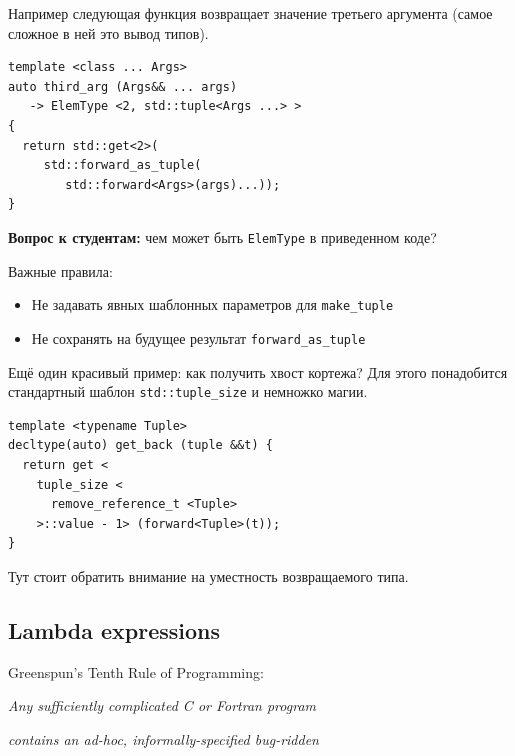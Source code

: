 \documentclass[a4paper,12pt,oneside]{article}
\newif\ifanswers
\begin{document}
Например следующая функция возвращает значение третьего аргумента (самое сложное в ней это вывод типов).

\begin{lstlisting}
template <class ... Args>
auto third_arg (Args&& ... args) 
   -> ElemType <2, std::tuple<Args ...> >
{
  return std::get<2>(
     std::forward_as_tuple(
        std::forward<Args>(args)...));
}
\end{lstlisting}

\textbf{Вопрос к студентам:} чем может быть \lstinline!ElemType! в приведенном коде?

\ifanswers
\lstinline!ElemType! это просто удобный синоним для сложного выводного типа:

\begin{lstlisting}
template <size_t i, class T>
using ElemType = decltype (
   std::get<i>(std::declval<T>()));
\end{lstlisting}
\fi

Важные правила: 

\begin{itemize}
\item Не задавать явных шаблонных параметров для \lstinline!make_tuple! 
\item Не сохранять на будущее результат \lstinline!forward_as_tuple!
\end{itemize}

Ещё один красивый пример: как получить хвост кортежа? Для этого понадобится стандартный шаблон \lstinline!std::tuple_size! и немножко магии.

\begin{lstlisting}
template <typename Tuple>
decltype(auto) get_back (tuple &&t) {
  return get < 
    tuple_size <
      remove_reference_t <Tuple>
    >::value - 1> (forward<Tuple>(t));
}
\end{lstlisting}

Тут стоит обратить внимание на уместность возвращаемого типа.

\pagebreak
\subsection{Lambda expressions}\label{LambdaExpressions}

\hfill{Greenspun's Tenth Rule of Programming:}

\hfill\textit{Any sufficiently complicated C or Fortran program}

\hfill\textit{contains an ad-hoc, informally-specified bug-ridden}
\end{document}
